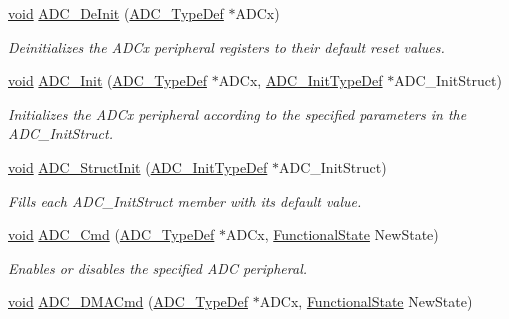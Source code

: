 \begin{DoxyCompactItemize}
\item 
\hyperlink{usb__devapi_8h_afabf60e7f57651d6d595a02c75f07cd0}{void} \hyperlink{group___a_d_c___private___functions_ga31fa6bc09de17125e9db2830ce77c09b}{A\+D\+C\+\_\+\+De\+Init} (\hyperlink{struct_a_d_c___type_def}{A\+D\+C\+\_\+\+Type\+Def} $\ast$A\+D\+Cx)
\begin{DoxyCompactList}\small\item\em Deinitializes the A\+D\+Cx peripheral registers to their default reset values. \end{DoxyCompactList}\item 
\hyperlink{usb__devapi_8h_afabf60e7f57651d6d595a02c75f07cd0}{void} \hyperlink{group___a_d_c___private___functions_gabbab6038cf8691404350625e477254f9}{A\+D\+C\+\_\+\+Init} (\hyperlink{struct_a_d_c___type_def}{A\+D\+C\+\_\+\+Type\+Def} $\ast$A\+D\+Cx, \hyperlink{struct_a_d_c___init_type_def}{A\+D\+C\+\_\+\+Init\+Type\+Def} $\ast$A\+D\+C\+\_\+\+Init\+Struct)
\begin{DoxyCompactList}\small\item\em Initializes the A\+D\+Cx peripheral according to the specified parameters in the A\+D\+C\+\_\+\+Init\+Struct. \end{DoxyCompactList}\item 
\hyperlink{usb__devapi_8h_afabf60e7f57651d6d595a02c75f07cd0}{void} \hyperlink{group___a_d_c___private___functions_ga6c6e754d1d0a98d56e465efaf73272ec}{A\+D\+C\+\_\+\+Struct\+Init} (\hyperlink{struct_a_d_c___init_type_def}{A\+D\+C\+\_\+\+Init\+Type\+Def} $\ast$A\+D\+C\+\_\+\+Init\+Struct)
\begin{DoxyCompactList}\small\item\em Fills each A\+D\+C\+\_\+\+Init\+Struct member with its default value. \end{DoxyCompactList}\item 
\hyperlink{usb__devapi_8h_afabf60e7f57651d6d595a02c75f07cd0}{void} \hyperlink{group___a_d_c___private___functions_ga40882d399e3371755ed610c1134e634e}{A\+D\+C\+\_\+\+Cmd} (\hyperlink{struct_a_d_c___type_def}{A\+D\+C\+\_\+\+Type\+Def} $\ast$A\+D\+Cx, \hyperlink{agilefox_2library_2inc_2stm32f10x__type_8h_ac9a7e9a35d2513ec15c3b537aaa4fba1}{Functional\+State} New\+State)
\begin{DoxyCompactList}\small\item\em Enables or disables the specified A\+DC peripheral. \end{DoxyCompactList}\item 
\hyperlink{usb__devapi_8h_afabf60e7f57651d6d595a02c75f07cd0}{void} \hyperlink{group___a_d_c___private___functions_gac5881d5995818001584b27b137a8dbcb}{A\+D\+C\+\_\+\+D\+M\+A\+Cmd} (\hyperlink{struct_a_d_c___type_def}{A\+D\+C\+\_\+\+Type\+Def} $\ast$A\+D\+Cx, \hyperlink{agilefox_2library_2inc_2stm32f10x__type_8h_ac9a7e9a35d2513ec15c3b537aaa4fba1}{Functional\+State} New\+State)

\end{DoxyCompactItemize}
